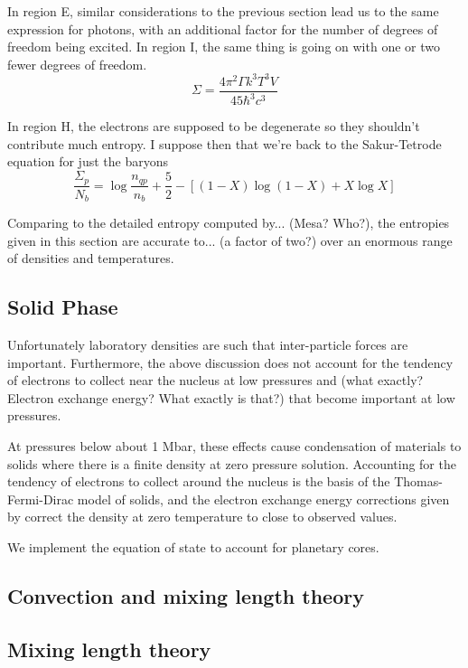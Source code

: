 \documentclass{emulateapj}
\begin{document}
In region E, similar considerations to the previous section lead us to
the same expression for photons, with an additional factor for the
number of degrees of freedom being excited.  In region I, the same
thing is going on with one or two fewer degrees of freedom.  
\begin{equation}
  \Sigma = \frac{4 \pi^2 \Gamma k^3 T^3 V}{45 \hbar^3 c^3}
\end{equation}

In region H, the electrons are supposed to be degenerate so they
shouldn't contribute much entropy.  I suppose then that we're back to
the Sakur-Tetrode equation for just the baryons
\begin{equation}
  \frac{\Sigma_p}{N_b} = 
\log{\frac{n_{qp}}{n_b}} + \frac{5}{2}
- \left[ (1-X)\log(1-X) + X \log X \right]
\label{eqn:entropy}
\end{equation}

Comparing to the detailed entropy computed by... (Mesa?  Who?),
the entropies given in this section are accurate to... (a factor of
two?) over an enormous range of densities and temperatures.

\subsection{Solid Phase}
Unfortunately laboratory densities are such that inter-particle forces
are important.  Furthermore, the above discussion does not account for
the tendency of electrons to collect near the nucleus at low pressures
and (what exactly?  Electron exchange energy?  What exactly is that?)
that become important at low pressures.  

At pressures below about 1 Mbar, these effects cause condensation of
materials to solids where there is a finite density at zero pressure
solution. Accounting for the tendency of electrons to collect around
the nucleus is the basis of the Thomas-Fermi-Dirac \citep{who?} model
of solids, and the electron exchange energy corrections given by
\citet{salpeter+zapolsky1967} correct the density at zero temperature
to close to observed values.

We implement the \citet{salpeter+zapolsky1967} equation of state to
account for planetary cores.

\subsection{Convection and mixing length theory}

\subsection{Mixing length theory}
                                   
\end{document}
